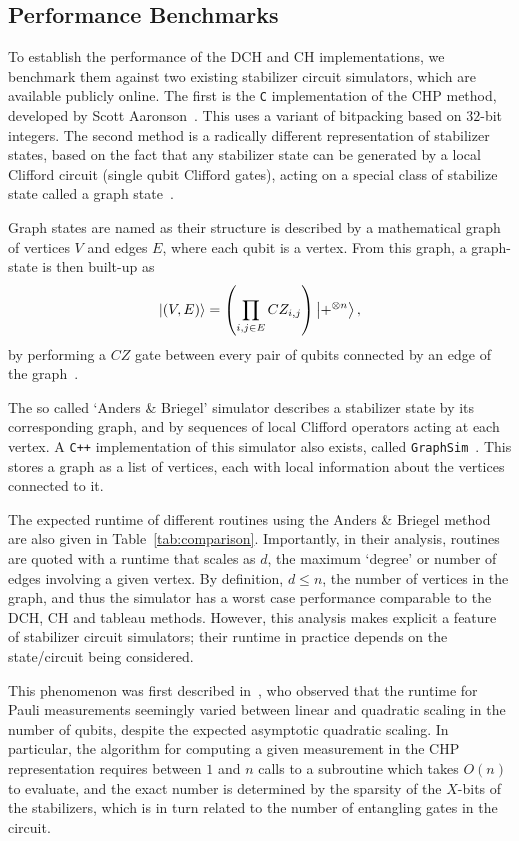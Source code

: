 \subsection{Performance Benchmarks}
To establish the performance of the DCH and CH implementations, we benchmark them against two existing stabilizer circuit simulators, which are available publicly online. The first is the \texttt{C} implementation of the CHP method, developed by Scott Aaronson~\cite{Aaronson2004b}. This uses a variant of bitpacking based on $32$-bit integers. The second method is a radically different representation of stabilizer states, based on the fact that any stabilizer state can be generated by a local Clifford circuit (single qubit Clifford gates), acting on a special class of stabilize state called a graph state~\cite{Schlingemann2001,VandenNest2004}.\par
Graph states are named as their structure is described by a mathematical graph of vertices $V$ and edges $E$, where each qubit is a vertex. From this graph, a graph-state is then built-up as
\[\ket{(V,E)} = \left(\prod_{i,j \in E}CZ_{i,j}\right)\ket{+^{\otimes n}},\]
by performing a $CZ$ gate between every pair of qubits connected by an edge of the graph~\cite{VandenNest2004}.\par
The so called `Anders \& Briegel' simulator describes a stabilizer state by its corresponding graph, and by sequences of local Clifford operators acting at each vertex. A \texttt{C++} implementation of this simulator also exists, called \texttt{GraphSim}~\cite{Anders2006b}. This stores a graph as a list of vertices, each with local information about the vertices connected to it.\par
The expected runtime of different routines using the Anders \& Briegel method are also given in Table~\ref{tab:comparison}. Importantly, in their analysis, routines are quoted with a runtime that scales as $d$, the maximum `degree' or number of edges involving a given vertex. By definition, $d\leq n$, the number of vertices in the graph, and thus the simulator has a worst case performance comparable to the DCH, CH and tableau methods. However, this analysis makes explicit a feature of stabilizer circuit simulators; their runtime in practice depends on the state/circuit being considered.\par
This phenomenon was first described in~\cite{Aaronson2004}, who observed that the runtime for Pauli measurements seemingly varied between linear and quadratic scaling in the number of qubits, despite the expected asymptotic quadratic scaling. In particular, the algorithm for computing a given measurement in the CHP representation requires between $1$ and $n$ calls to a subroutine which takes $O(n)$ to evaluate, and the exact number is determined by the sparsity of the $X$-bits of the stabilizers, which is in turn related to the number of entangling gates in the circuit.\par
